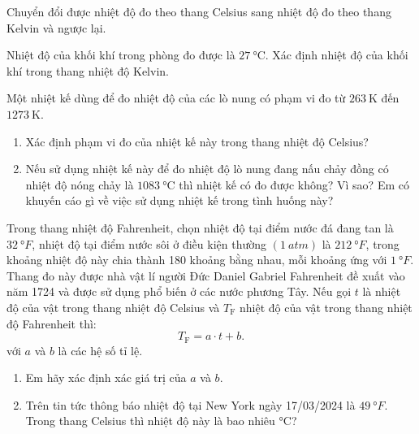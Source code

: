 \begin{dang}{Chuyển đổi được nhiệt độ đo theo thang Celsius sang nhiệt độ đo theo thang Kelvin và ngược lại.}
	{Nhiệt độ của khối khí trong phòng đo được là $\SI{27}{\celsius}$. Xác định nhiệt độ của khối khí trong thang nhiệt độ Kelvin.
	
}
{

}

{Một nhiệt kế dùng để đo nhiệt độ của các lò nung có phạm vi đo từ $\SI{263}{\kelvin}$ đến $\SI{1273}{\kelvin}$.
	\begin{enumerate}[label=\alph*)]
		\item Xác định phạm vi đo của nhiệt kế này trong thang nhiệt độ Celsius?
		\item Nếu sử dụng nhiệt kế này để đo nhiệt độ lò nung đang nấu chảy đồng có nhiệt độ nóng chảy là $\SI{1083}{\celsius}$ thì nhiệt kế có đo được không? Vì sao? Em có khuyến cáo gì về việc sử dụng nhiệt kế trong tình huống này?
	\end{enumerate}

}
{
}
	
	{Trong thang nhiệt độ Fahrenheit, chọn nhiệt độ tại điểm nước đá đang tan là $\SI{32}{\degree F}$, nhiệt độ tại điểm nước sôi ở điều kiện thường $\left(\SI{1}{atm}\right)$ là $\SI{212}{\degree F}$, trong khoảng nhiệt độ này chia thành 180 khoảng bằng nhau, mỗi khoảng ứng với $\SI{1}{\degree F}$. Thang đo này được nhà vật lí người Đức Daniel Gabriel Fahrenheit đề xuất vào năm 1724 và được sử dụng phổ biến ở các nước phương Tây. Nếu gọi $t$ là nhiệt độ của vật trong thang nhiệt độ Celsius và $T_\text{F}$ nhiệt độ của vật trong thang nhiệt độ Fahrenheit thì:
		$$T_\text{F}=a\cdot t+b.$$
		với $a$ và $b$ là các hệ số tỉ lệ.
		\begin{enumerate}[label=\alph*)]
			\item Em hãy xác định xác giá trị của $a$ và $b$.
			\item Trên tin tức thông báo nhiệt độ tại New York ngày 17/03/2024 là $\SI{49}{\degree F}$. Trong thang Celsius thì nhiệt độ này là bao nhiêu $\si{\celsius}$?
		\end{enumerate}
	
}
\end{dang}
